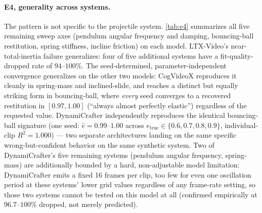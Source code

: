 \paragraph{E4, generality across systems.}
The pattern is not specific to the projectile system. \autoref{tab:e4}
summarizes all five remaining sweep axes (pendulum angular frequency and
damping, bouncing-ball restitution, spring stiffness, incline friction) on
each model. LTX-Video's near-total-inertia failure generalizes: four of five
additional systems have a fit-quality-dropped rate of $94$--$100\%$. The
seed-determined, parameter-independent convergence generalizes on the other
two models: CogVideoX reproduces it cleanly in spring-mass and inclined-slide,
and reaches a distinct but equally striking form in bouncing-ball, where
\emph{every} seed converges to a recovered restitution in $[0.97,1.00]$
(``always almost perfectly elastic'') regardless of the requested value.
DynamiCrafter independently reproduces the identical bouncing-ball signature
(one seed: $\hat e = 0.99$--$1.00$ across $e_\text{true}\in\{0.6,0.7,0.8,0.9\}$,
individual-clip $R^2=1.000$) --- two separate architectures landing on the
same specific wrong-but-confident behavior on the same synthetic system. Two
of DynamiCrafter's five remaining systems (pendulum angular frequency,
spring-mass) are additionally bounded by a hard, non-adjustable model
limitation: DynamiCrafter emits a fixed 16 frames per clip, too few for even
one oscillation period at these systems' lower grid values regardless of any
frame-rate setting, so those two systems cannot be tested on this model at
all (confirmed empirically at $96.7$--$100\%$ dropped, not merely predicted).

